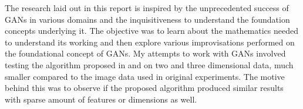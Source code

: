 \documentclass[10pt,journal,compsoc]{IEEEtran}
\begin{document}
The research laid out in this report is inspired by the unprecedented success of GANs in various domains and the inquisitiveness to understand the foundation concepts underlying it. The objective was to learn about the mathematics needed to understand its working and then explore various improvisations performed on the foundational concept of GANs. My attempts to work with GANs involved testing the algorithm proposed in \cite{vanillagans} and \cite{ledig2017photo} on two and three dimensional data, much smaller compared to the image data used in original experiments. The motive behind this was to observe if the proposed algorithm produced similar results with sparse amount of features or dimensions as well. 

 




%
%

\end{document}
